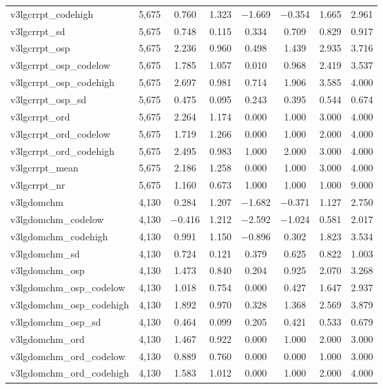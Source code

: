 \begin{table}[!htbp]
\begin{tabular}{@{\extracolsep{5pt}}lccccccc}
v3lgcrrpt\_codehigh & 5,675 & 0.760 & 1.323 & $-$1.669 & $-$0.354 & 1.665 & 2.961 \\ 
v3lgcrrpt\_sd & 5,675 & 0.748 & 0.115 & 0.334 & 0.709 & 0.829 & 0.917 \\ 
v3lgcrrpt\_osp & 5,675 & 2.236 & 0.960 & 0.498 & 1.439 & 2.935 & 3.716 \\ 
v3lgcrrpt\_osp\_codelow & 5,675 & 1.785 & 1.057 & 0.010 & 0.968 & 2.419 & 3.537 \\ 
v3lgcrrpt\_osp\_codehigh & 5,675 & 2.697 & 0.981 & 0.714 & 1.906 & 3.585 & 4.000 \\ 
v3lgcrrpt\_osp\_sd & 5,675 & 0.475 & 0.095 & 0.243 & 0.395 & 0.544 & 0.674 \\ 
v3lgcrrpt\_ord & 5,675 & 2.264 & 1.174 & 0.000 & 1.000 & 3.000 & 4.000 \\ 
v3lgcrrpt\_ord\_codelow & 5,675 & 1.719 & 1.266 & 0.000 & 1.000 & 2.000 & 4.000 \\ 
v3lgcrrpt\_ord\_codehigh & 5,675 & 2.495 & 0.983 & 1.000 & 2.000 & 3.000 & 4.000 \\ 
v3lgcrrpt\_mean & 5,675 & 2.186 & 1.258 & 0.000 & 1.000 & 3.000 & 4.000 \\ 
v3lgcrrpt\_nr & 5,675 & 1.160 & 0.673 & 1.000 & 1.000 & 1.000 & 9.000 \\ 
v3lgdomchm & 4,130 & 0.284 & 1.207 & $-$1.682 & $-$0.371 & 1.127 & 2.750 \\ 
v3lgdomchm\_codelow & 4,130 & $-$0.416 & 1.212 & $-$2.592 & $-$1.024 & 0.581 & 2.017 \\ 
v3lgdomchm\_codehigh & 4,130 & 0.991 & 1.150 & $-$0.896 & 0.302 & 1.823 & 3.534 \\ 
v3lgdomchm\_sd & 4,130 & 0.724 & 0.121 & 0.379 & 0.625 & 0.822 & 1.003 \\ 
v3lgdomchm\_osp & 4,130 & 1.473 & 0.840 & 0.204 & 0.925 & 2.070 & 3.268 \\ 
v3lgdomchm\_osp\_codelow & 4,130 & 1.018 & 0.754 & 0.000 & 0.427 & 1.647 & 2.937 \\ 
v3lgdomchm\_osp\_codehigh & 4,130 & 1.892 & 0.970 & 0.328 & 1.368 & 2.569 & 3.879 \\ 
v3lgdomchm\_osp\_sd & 4,130 & 0.464 & 0.099 & 0.205 & 0.421 & 0.533 & 0.679 \\ 
v3lgdomchm\_ord & 4,130 & 1.467 & 0.922 & 0.000 & 1.000 & 2.000 & 3.000 \\ 
v3lgdomchm\_ord\_codelow & 4,130 & 0.889 & 0.760 & 0.000 & 0.000 & 1.000 & 3.000 \\ 
v3lgdomchm\_ord\_codehigh & 4,130 & 1.583 & 1.012 & 0.000 & 1.000 & 2.000 & 4.000 \\ 

\end{tabular}
\end{table}
